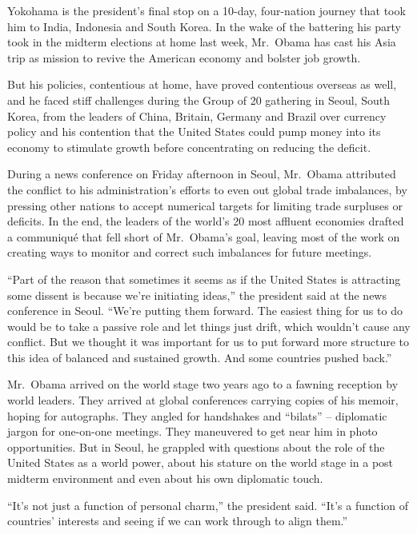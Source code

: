 ﻿\documentclass[12pt]{article}
\begin{document}
Yokohama is the president's final stop on a 10-day, four-nation journey that took him to India,
Indonesia and South Korea. In the wake of the battering his party took in the midterm elections at
home last week, Mr.~Obama has cast his Asia trip as mission to revive the American economy and
bolster job growth.

But his policies, contentious at home, have proved contentious overseas as well, and he faced stiff
challenges during the Group of 20 gathering in Seoul, South Korea, from the leaders of China,
Britain, Germany and Brazil over currency policy and his contention that the United States could
pump money into its economy to stimulate growth before concentrating on reducing the deficit.

During a news conference on Friday afternoon in Seoul, Mr.~Obama attributed the conflict to his
administration's efforts to even out global trade imbalances, by pressing other nations to accept
numerical targets for limiting trade surpluses or deficits. In the end, the leaders of the world's
20 most affluent economies drafted a communiqu\'e that fell short of Mr.~Obama's goal, leaving most
of the work on creating ways to monitor and correct such imbalances for future meetings.

``Part of the reason that sometimes it seems as if the United States is attracting some dissent is
because we're initiating ideas,'' the president said at the news conference in Seoul. ``We're
putting them forward. The easiest thing for us to do would be to take a passive role and let things
just drift, which wouldn't cause any conflict. But we thought it was important for us to put forward
more structure to this idea of balanced and sustained growth. And some countries pushed back.''

Mr.~Obama arrived on the world stage two years ago to a fawning reception by world leaders. They
arrived at global conferences carrying copies of his memoir, hoping for autographs. They angled for
handshakes and ``bilats'' -- diplomatic jargon for one-on-one meetings. They maneuvered to get near
him in photo opportunities. But in Seoul, he grappled with questions about the role of the United
States as a world power, about his stature on the world stage in a post midterm environment and even
about his own diplomatic touch.

``It's not just a function of personal charm,'' the president said. ``It's a function of countries'
interests and seeing if we can work through to align them.''
\end{document}
